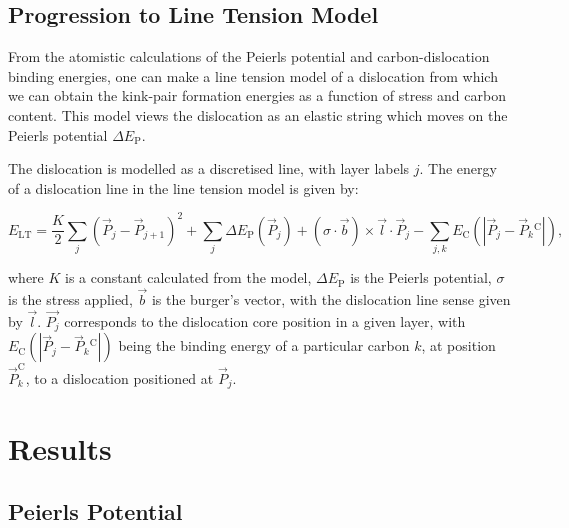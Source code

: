 \documentclass[a4paper,11pt]{article}
\begin{document}
\subsection{Progression to Line Tension Model}
\label{sec:org2ba9706}

From the atomistic calculations of the Peierls potential and carbon-dislocation binding energies, one can make a
line tension model of a dislocation from which we can obtain the kink-pair formation energies as
a function of stress and carbon content.  This model views the dislocation as an elastic string
which moves on the Peierls potential \(\Delta E_{\text{P}}\).

The dislocation is modelled as a discretised line, with layer labels \(j\). The energy of a
dislocation line in the line tension model is given by:

\[ E_{\text{LT}} = \frac{K}{2} \sum_j (\vec{P}_j - \vec{P}_{j+1} )^2  + \sum_j \Delta E_{\text{P}}  (\vec{P}_j) +
   (\sigma \cdot \vec{b}) \times \vec{l} \cdot \vec{P}_j  - \sum_{j,k} E_{\text{C}} (|\vec{P}_j-\vec{P}_k^{}^{\text{C}}|), \]

where \(K\) is a constant calculated from the model, \(\Delta E_{\text{P}}\) is the Peierls potential, \(\sigma\) is
the stress applied, \(\vec{b}\) is the burger's vector, with the dislocation line sense given by
\(\vec{l}\). \(\vec{P_{j}}\) corresponds to the dislocation core position in a given
layer, with \(E_{\text{C}} (|\vec{P}_j-\vec{P}_k^{}^{\text{C}}|)\) being the binding energy of a particular carbon
\(k\), at position \(\vec{P}_k^{\text{C}}\), to a dislocation positioned at \(\vec{P}_j\). 

\section{Results}
\label{sec:orgd7db615}

\subsection{Peierls Potential}
\label{sec:org457041f}
\end{document}
